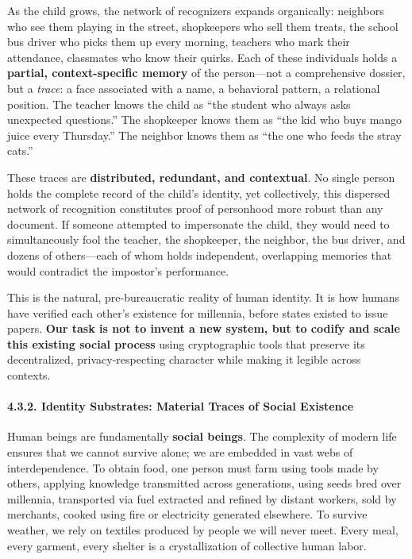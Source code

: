 As the child grows, the network of recognizers expands organically:
neighbors who see them playing in the street, shopkeepers who sell them
treats, the school bus driver who picks them up every morning, teachers
who mark their attendance, classmates who know their quirks. Each of
these individuals holds a \textbf{partial, context-specific memory} of
the person---not a comprehensive dossier, but a \emph{trace}: a face
associated with a name, a behavioral pattern, a relational position. The
teacher knows the child as ``the student who always asks unexpected
questions.'' The shopkeeper knows them as ``the kid who buys mango juice
every Thursday.'' The neighbor knows them as ``the one who feeds the
stray cats.''

These traces are \textbf{distributed, redundant, and contextual}. No
single person holds the complete record of the child's identity, yet
collectively, this dispersed network of recognition constitutes proof of
personhood more robust than any document. If someone attempted to
impersonate the child, they would need to simultaneously fool the
teacher, the shopkeeper, the neighbor, the bus driver, and dozens of
others---each of whom holds independent, overlapping memories that would
contradict the impostor's performance.

This is the natural, pre-bureaucratic reality of human identity. It is
how humans have verified each other's existence for millennia, before
states existed to issue papers. \textbf{Our task is not to invent a new
system, but to codify and scale this existing social process} using
cryptographic tools that preserve its decentralized, privacy-respecting
character while making it legible across contexts.

\paragraph{4.3.2. Identity Substrates: Material Traces of Social
Existence}\label{identity-substrates-material-traces-of-social-existence}

Human beings are fundamentally \textbf{social beings}. The complexity of
modern life ensures that we cannot survive alone; we are embedded in
vast webs of interdependence. To obtain food, one person must farm using
tools made by others, applying knowledge transmitted across generations,
using seeds bred over millennia, transported via fuel extracted and
refined by distant workers, sold by merchants, cooked using fire or
electricity generated elsewhere. To survive weather, we rely on textiles
produced by people we will never meet. Every meal, every garment, every
shelter is a crystallization of collective human labor.

